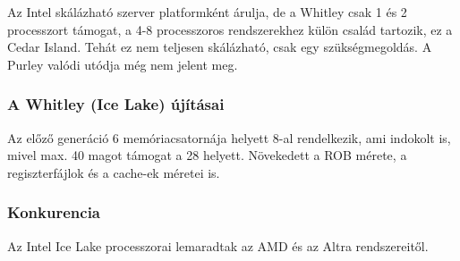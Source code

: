 Az Intel skálázható szerver platformként árulja, de a Whitley csak 1 és 2 processzort támogat, a 4-8 processzoros rendszerekhez külön család tartozik, ez a Cedar Island.
Tehát ez nem teljesen skálázható, csak egy szükségmegoldás.
A Purley valódi utódja még nem jelent meg.

\subsubsection{A Whitley (Ice Lake) újításai}
Az előző generáció 6 memóriacsatornája helyett 8-al rendelkezik, ami indokolt is, mivel max. 40 magot támogat a 28 helyett.
Növekedett a ROB mérete, a regiszterfájlok és a cache-ek méretei is.

\subsubsection{Konkurencia}
Az Intel Ice Lake processzorai lemaradtak az AMD és az Altra rendszereitől.